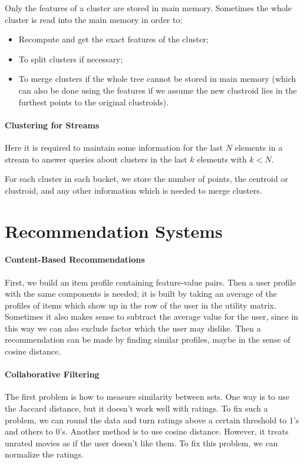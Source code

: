 \documentclass{article}
\begin{document}
Only the features of a cluster are stored in main memory. Sometimes the whole cluster is read into the main memory in order to:
\begin{itemize}
\item Recompute and get the exact features of the cluster;
\item To split clusters if necessary;
\item To merge clusters if the whole tree cannot be stored in main memory (which can also be done using the features if we assume the new clustroid lies in the furthest points to the original clustroids).
\end{itemize}

\paragraph{Clustering for Streams}
Here it is required to maintain some information for the last $N$ elements in a stream to answer queries about clusters in the last $k$ elements with $k<N$.

For each cluster in each bucket, we store the number of points, the centroid or clustroid, and any other information which is needed to merge clusters.

\section*{Recommendation Systems}
\paragraph{Content-Based Recommendations}
First, we build an item profile containing feature-value pairs. Then a user profile with the same components is needed; it is built by taking an average of the profiles of items which show up in the row of the user in the utility matrix. Sometimes it also makes sense to subtract the average value for the user, since in this way we can also exclude factor which the user may dislike. Then a recommendation can be made by finding similar profiles, maybe in the sense of cosine distance.

\paragraph{Collaborative Filtering}
The first problem is how to measure similarity between sets. One way is to use the Jaccard distance, but it doesn't work well with ratings. To fix such a problem, we can round the data and turn ratings above a certain threshold to 1's and others to 0's. Another method is to use cosine distance. However, it treats unrated movies as if the user doesn't like them. To fix this problem, we can normalize the ratings.
\end{document}
